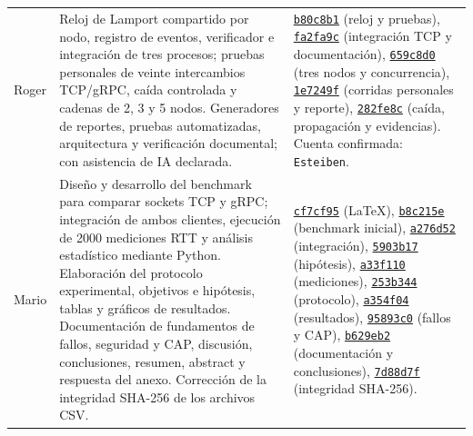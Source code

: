 \begin{table}[htbp]
\begin{tabularx}{\linewidth}{@{}lXX@{}}
Roger & Reloj de Lamport compartido por nodo, registro de eventos, verificador e integración de tres procesos; pruebas personales de veinte intercambios TCP/gRPC, caída controlada y cadenas de 2, 3 y 5 nodos. Generadores de reportes, pruebas automatizadas, arquitectura y verificación documental; con asistencia de IA declarada. & \href{https://github.com/Yukisan-uwo/GA-SUM-02-PE-U1-Practica-Experimental-Unidad-1/commit/b80c8b199c4a609b240038651adeb04df98d6220}{\texttt{b80c8b1}} (reloj y pruebas), \href{https://github.com/Yukisan-uwo/GA-SUM-02-PE-U1-Practica-Experimental-Unidad-1/commit/fa2fa9cac953d6f0e4e8e0e108b4853cc185c825}{\texttt{fa2fa9c}} (integración TCP y documentación), \href{https://github.com/Yukisan-uwo/GA-SUM-02-PE-U1-Practica-Experimental-Unidad-1/commit/659c8d006d82875030fbefdffba850398e831851}{\texttt{659c8d0}} (tres nodos y concurrencia), \href{https://github.com/Yukisan-uwo/GA-SUM-02-PE-U1-Practica-Experimental-Unidad-1/commit/1e7249fe151f0ada719347c2ec6c2f287df66be8}{\texttt{1e7249f}} (corridas personales y reporte), \href{https://github.com/Yukisan-uwo/GA-SUM-02-PE-U1-Practica-Experimental-Unidad-1/commit/282fe8c8076b40b959dc262f6e310fb831e8d6c8}{\texttt{282fe8c}} (caída, propagación y evidencias). Cuenta confirmada: \texttt{Esteiben}. \\


Mario &
Diseño y desarrollo del benchmark para comparar sockets TCP y gRPC; integración de ambos clientes, ejecución de 2000 mediciones RTT y análisis estadístico mediante Python. Elaboración del protocolo experimental, objetivos e hipótesis, tablas y gráficos de resultados. Documentación de fundamentos de fallos, seguridad y CAP, discusión, conclusiones, resumen, abstract y respuesta del anexo. Corrección de la integridad SHA-256 de los archivos CSV. &
\href{https://github.com/Yukisan-uwo/GA-SUM-02-PE-U1-Practica-Experimental-Unidad-1/commit/cf7cf9582f}{\texttt{cf7cf95}} (LaTeX),
\href{https://github.com/Yukisan-uwo/GA-SUM-02-PE-U1-Practica-Experimental-Unidad-1/commit/b8c215ee8a}{\texttt{b8c215e}} (benchmark inicial),
\href{https://github.com/Yukisan-uwo/GA-SUM-02-PE-U1-Practica-Experimental-Unidad-1/commit/a276d52f33}{\texttt{a276d52}} (integración),
\href{https://github.com/Yukisan-uwo/GA-SUM-02-PE-U1-Practica-Experimental-Unidad-1/commit/5903b17d85}{\texttt{5903b17}} (hipótesis),
\href{https://github.com/Yukisan-uwo/GA-SUM-02-PE-U1-Practica-Experimental-Unidad-1/commit/a33f110c44}{\texttt{a33f110}} (mediciones),
\href{https://github.com/Yukisan-uwo/GA-SUM-02-PE-U1-Practica-Experimental-Unidad-1/commit/253b3445b0}{\texttt{253b344}} (protocolo),
\href{https://github.com/Yukisan-uwo/GA-SUM-02-PE-U1-Practica-Experimental-Unidad-1/commit/a354f04f6c}{\texttt{a354f04}} (resultados),
\href{https://github.com/Yukisan-uwo/GA-SUM-02-PE-U1-Practica-Experimental-Unidad-1/commit/95893c07bf}{\texttt{95893c0}} (fallos y CAP),
\href{https://github.com/Yukisan-uwo/GA-SUM-02-PE-U1-Practica-Experimental-Unidad-1/commit/b629eb2897}{\texttt{b629eb2}} (documentación y conclusiones),
\href{https://github.com/Yukisan-uwo/GA-SUM-02-PE-U1-Practica-Experimental-Unidad-1/commit/7d88d7fbb3}{\texttt{7d88d7f}} (integridad SHA-256). \\


\end{tabularx}
\end{table}
